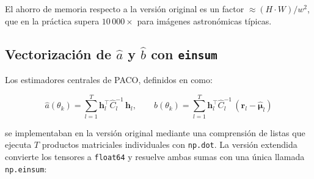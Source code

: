 \begin{algorithm}[H]
\caption{Extracción de parche -- versión extendida con caché}
\label{alg:getpatch_nuevo}
\end{algorithm}

El ahorro de memoria respecto a la versión original es un factor $\approx (H \cdot W) / w^2$, que en la práctica supera $10\,000\times$ para imágenes astronómicas típicas.

\subsection{Vectorización de \texorpdfstring{$\hat{a}$}{a} y \texorpdfstring{$\hat{b}$}{b} con \texttt{einsum}}

Los estimadores centrales de PACO, definidos en \citet{Flasseur_2018} como:

\begin{equation}\label{eq:a_b_estimators}
    \hat{a}(\theta_k) = \sum_{l=1}^{T} \mathbf{h}_l^\top \hat{C}_l^{-1}\, \mathbf{h}_l, \qquad
    \hat{b}(\theta_k) = \sum_{l=1}^{T} \mathbf{h}_l^\top \hat{C}_l^{-1}\, (\mathbf{r}_l - \hat{\boldsymbol{\mu}}_l)
\end{equation}

se implementaban en la versión original mediante una comprensión de listas que ejecuta $T$ productos matriciales individuales con \texttt{np.dot}. La versión extendida convierte los tensores a \texttt{float64} y resuelve ambas sumas con una única llamada \texttt{np.einsum}:

